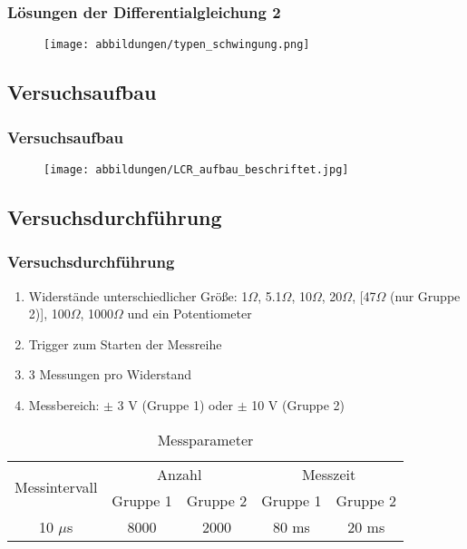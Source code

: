 \documentclass{beamer}
\begin{document}
\begin{frame}
\frametitle{Lösungen der Differentialgleichung 2}
\begin{figure}
\texttt{[image: abbildungen/typen\_schwingung.png]}
\end{figure}
\end{frame}


\subsection{Versuchsaufbau}

\begin{frame}
\frametitle{Versuchsaufbau}
\begin{figure}
\texttt{[image: abbildungen/LCR\_aufbau\_beschriftet.jpg]}
\end{figure}
\end{frame}


\subsection{Versuchsdurchführung}

\begin{frame}
\frametitle{Versuchsdurchführung}

\begin{enumerate}[-]
\item Widerstände unterschiedlicher Größe: 1$\Omega$, 5.1$\Omega$, 10$\Omega$, 20$\Omega$, [47$\Omega$ (nur Gruppe 2)], 100$\Omega$, 1000$\Omega$ und ein Potentiometer
\item Trigger zum Starten der Messreihe
\item 3 Messungen pro Widerstand
\item Messbereich: $\pm$ 3 V (Gruppe 1) oder $\pm$ 10 V (Gruppe 2)
\end{enumerate}

\begin{table}
\begin{tabular}{|c|c|c|c|c|}
\hline
\multirow{2}{*}{Messintervall} & \multicolumn{2}{c|}{Anzahl} & \multicolumn{2}{c|}{Messzeit} \\
\cline{2-5}
& Gruppe 1 & Gruppe 2 & Gruppe 1 & Gruppe 2 \\
\hline
10 $\mu$s & 8000 & 2000 & 80 ms & 20 ms \\
\hline
\end{tabular}
\caption{Messparameter}
\end{table}
\end{frame}
\end{document}
